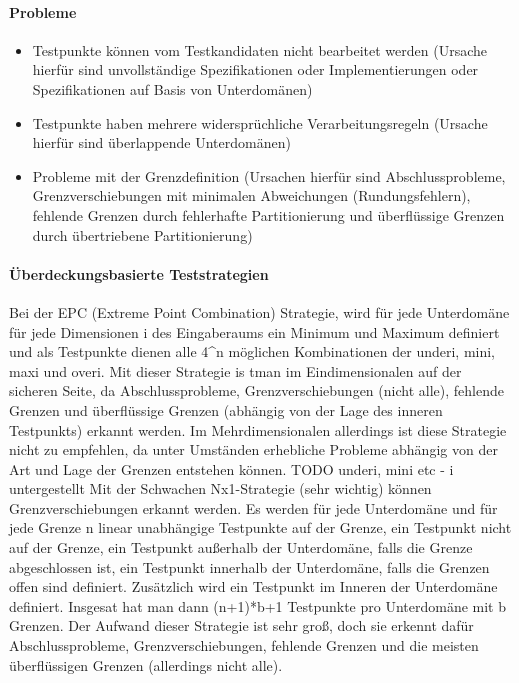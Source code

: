 \paragraph{Probleme}
\begin{itemize}
\item Testpunkte können vom Testkandidaten nicht bearbeitet werden (Ursache hierfür sind unvollständige Spezifikationen oder Implementierungen oder Spezifikationen auf Basis von Unterdomänen)
\item Testpunkte haben mehrere widersprüchliche Verarbeitungsregeln (Ursache hierfür sind überlappende Unterdomänen)
\item Probleme mit der Grenzdefinition (Ursachen hierfür sind Abschlussprobleme, Grenzverschiebungen mit minimalen Abweichungen (Rundungsfehlern), fehlende Grenzen durch fehlerhafte Partitionierung und überflüssige Grenzen durch übertriebene Partitionierung)
\end{itemize}

\paragraph{Überdeckungsbasierte Teststrategien}
Bei der EPC (Extreme Point Combination) Strategie, wird für jede Unterdomäne für jede Dimensionen i des Eingaberaums ein Minimum und Maximum definiert und als Testpunkte dienen alle 4^n möglichen Kombinationen der underi, mini, maxi und overi. 
Mit dieser Strategie is tman im Eindimensionalen auf der sicheren Seite, da Abschlussprobleme, Grenzverschiebungen (nicht alle), fehlende Grenzen und überflüssige Grenzen (abhängig von der Lage des inneren Testpunkts) erkannt werden. Im Mehrdimensionalen allerdings ist diese Strategie nicht zu empfehlen, da unter Umständen erhebliche Probleme abhängig von der Art und Lage der Grenzen entstehen können.
TODO underi, mini etc - i untergestellt
\linebreak
Mit der Schwachen Nx1-Strategie (sehr wichtig) können Grenzverschiebungen erkannt werden. Es werden für jede Unterdomäne und für jede Grenze n linear unabhängige Testpunkte auf der Grenze, ein Testpunkt nicht auf der Grenze, ein Testpunkt außerhalb der Unterdomäne, falls die Grenze abgeschlossen ist, ein Testpunkt innerhalb der Unterdomäne, falls die Grenzen offen sind definiert. Zusätzlich wird ein Testpunkt im Inneren der Unterdomäne definiert. Insgesat hat man dann (n+1)*b+1 Testpunkte pro Unterdomäne mit b Grenzen. Der Aufwand dieser Strategie ist sehr groß, doch sie erkennt dafür Abschlussprobleme, Grenzverschiebungen, fehlende Grenzen und die meisten überflüssigen Grenzen (allerdings nicht alle).